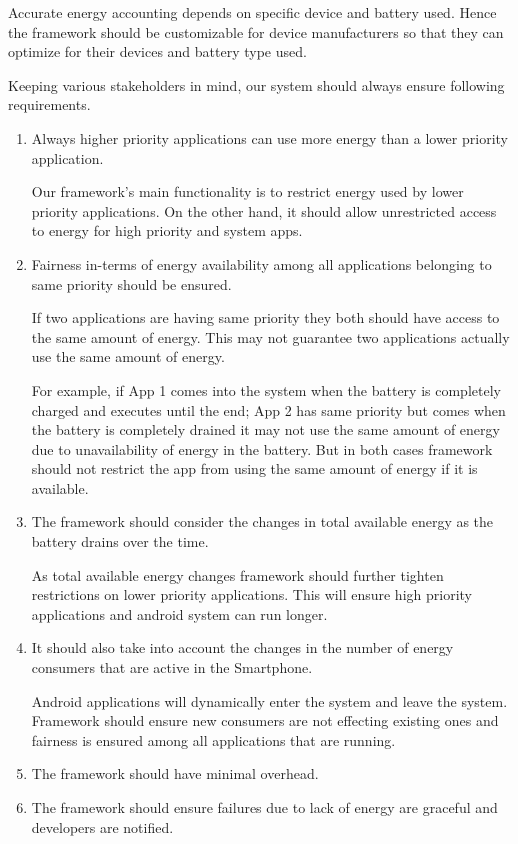 Accurate energy accounting depends on specific device and battery used. Hence the framework should be customizable for device manufacturers so that they can optimize for their devices and battery type used. 


Keeping various stakeholders in mind, our system should always ensure following requirements.

\begin{enumerate}
\item Always higher priority applications can use more energy than a lower priority application.

Our framework's main functionality is to restrict energy used by lower priority applications. On the other hand, it should allow unrestricted access to energy for high priority and system apps.

\item Fairness in-terms of energy availability among all applications belonging to same priority should be ensured.

If two applications are having same priority they both should have access to the same amount of energy. This may not guarantee two applications actually use the same amount of energy. 

For example, if App 1 comes into the system when the battery is completely charged and executes until the end;  App 2 has same priority but comes when the battery is completely drained it may not use the same amount of energy due to unavailability of energy in the battery. But in both cases framework should not restrict the app from using the same amount of energy if it is available.

\item The framework should consider the changes in total available energy as the battery drains over the time.

As total available energy changes framework should further tighten restrictions on lower priority applications. This will ensure high priority applications and android system can run longer. 

\item It should also take into account the changes in the number of energy consumers that are active in the Smartphone. 

Android applications will dynamically enter the system and leave the system. Framework should ensure new consumers are not effecting existing ones and fairness is ensured among all applications that are running.

\item The framework should have minimal overhead.
\item The framework should ensure failures due to lack of energy are graceful and developers are notified.


\end{enumerate}
